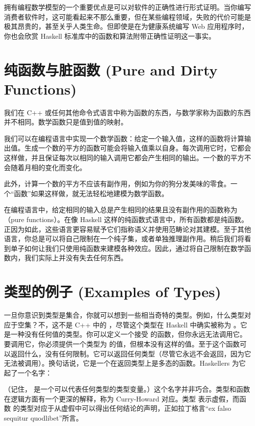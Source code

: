 拥有编程数学模型的一个重要优点是可以对软件的正确性进行形式证明。当你编写消费者软件时，这可能看起来不那么重要，但在某些编程领域，失败的代价可能是极其昂贵的，甚至关乎人类生命。但即使是在为健康系统编写 Web 应用程序时，你也会欣赏 Haskell 标准库中的函数和算法附带正确性证明这一事实。

\section{纯函数与脏函数 (Pure and Dirty Functions)}

我们在 C++ 或任何其他命令式语言中称为函数的东西，与数学家称为函数的东西并不相同。数学函数只是值到值的映射。

我们可以在编程语言中实现一个数学函数：给定一个输入值，这样的函数将计算输出值。生成一个数的平方的函数可能会将输入值乘以自身。每次调用它时，它都会这样做，并且保证每次以相同的输入调用它都会产生相同的输出。一个数的平方不会随着月相的变化而变化。

此外，计算一个数的平方不应该有副作用，例如为你的狗分发美味的零食。一个“函数”如果这样做，就无法轻松地建模为数学函数。

在编程语言中，给定相同的输入总是产生相同的结果且没有副作用的函数称为（pure functions）。在像 Haskell 这样的纯函数式语言中，所有函数都是纯函数。正因为如此，这些语言更容易赋予它们指称语义并使用范畴论对其建模。至于其他语言，你总是可以将自己限制在一个纯子集，或者单独推理副作用。稍后我们将看到单子如何让我们只使用纯函数来建模各种效应。因此，通过将自己限制在数学函数内，我们实际上并没有失去任何东西。

\section{类型的例子 (Examples of Types)}

一旦你意识到类型是集合，你就可以想到一些相当奇特的类型。例如，什么类型对应于空集？不，这不是 C++ 中的 ，尽管这个类型在 Haskell 中确实被称为 。它是一种没有任何值的类型。你可以定义一个接受  的函数，但你永远无法调用它。要调用它，你必须提供一个类型为  的值，但根本没有这样的值。至于这个函数可以返回什么，没有任何限制。它可以返回任何类型（尽管它永远不会返回，因为它无法被调用）。换句话说，它是一个在返回类型上是多态的函数。Haskellers 为它起了一个名字：

（记住， 是一个可以代表任何类型的类型变量。）这个名字并非巧合。类型和函数在逻辑方面有一个更深的解释，称为 Curry-Howard 对应。类型  表示虚假，而函数  的类型对应于从虚假中可以得出任何结论的声明，正如拉丁格言“ex falso sequitur quodlibet”所言。

